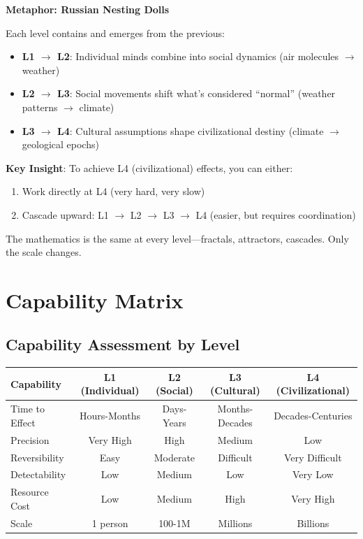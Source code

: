 \documentclass[11pt,twoside]{book}
\renewcommand{\arraystretch}{1.2}
\theoremstyle{definition}
\theoremstyle{plain}
\theoremstyle{remark}
\begin{document}
\begin{tcolorbox}[colback=green!5!white,colframe=green!65!black,title=\textbf{Plain English: How the Levels Connect},breakable]

\textbf{Metaphor: Russian Nesting Dolls}

Each level contains and emerges from the previous:
\begin{itemize}
    \item \textbf{L1 $\to$ L2}: Individual minds combine into social dynamics (air molecules $\to$ weather)
    \item \textbf{L2 $\to$ L3}: Social movements shift what's considered ``normal'' (weather patterns $\to$ climate)
    \item \textbf{L3 $\to$ L4}: Cultural assumptions shape civilizational destiny (climate $\to$ geological epochs)
\end{itemize}

\textbf{Key Insight}: To achieve L4 (civilizational) effects, you can either:
\begin{enumerate}
    \item Work directly at L4 (very hard, very slow)
    \item Cascade upward: L1 $\to$ L2 $\to$ L3 $\to$ L4 (easier, but requires coordination)
\end{enumerate}

The mathematics is the same at every level---fractals, attractors, cascades. Only the scale changes.
\end{tcolorbox}

\chapter{Capability Matrix}
\label{ch:cogwar-capability}

\section{Capability Assessment by Level}

\begin{center}
\small
\renewcommand{\arraystretch}{1.3}
\begin{tabularx}{\textwidth}{l|c|c|c|c}
\toprule
\textbf{Capability} & \textbf{L1 (Individual)} & \textbf{L2 (Social)} & \textbf{L3 (Cultural)} & \textbf{L4 (Civilizational)} \\
\midrule
Time to Effect & Hours-Months & Days-Years & Months-Decades & Decades-Centuries \\
\midrule
Precision & Very High & High & Medium & Low \\
\midrule
Reversibility & Easy & Moderate & Difficult & Very Difficult \\
\midrule
Detectability & Low & Medium & Low & Very Low \\
\midrule
Resource Cost & Low & Medium & High & Very High \\
\midrule
Scale & 1 person & 100-1M & Millions & Billions \\
\bottomrule
\end{tabularx}
\end{center}
\end{document}
